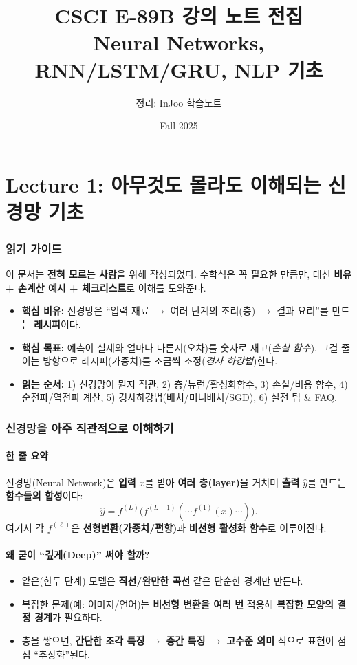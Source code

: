 \documentclass[12pt]{article}
\title{CSCI E-89B 강의 노트 전집 \\ \large Neural Networks, RNN/LSTM/GRU, NLP 기초}
\author{정리: InJoo 학습노트}
\date{Fall 2025}
\begin{document}
\maketitle

\tableofcontents
\newpage

\part{Lecture 1: 아무것도 몰라도 이해되는 신경망 기초}

\section*{읽기 가이드}
이 문서는 \textbf{전혀 모르는 사람}을 위해 작성되었다.
수학식은 꼭 필요한 만큼만, 대신 \textbf{비유 + 손계산 예시 + 체크리스트}로 이해를 도와준다.

\begin{itemize}[left=0pt]
  \item \textbf{핵심 비유:} 신경망은 ``입력 재료 $\rightarrow$ 여러 단계의 조리(층) $\rightarrow$ 결과 요리''를 만드는 \textbf{레시피}이다.
  \item \textbf{핵심 목표:} 예측이 실제와 얼마나 다른지(오차)를 숫자로 재고(\textit{손실 함수}), 그걸 줄이는 방향으로 레시피(가중치)를 조금씩 조정(\textit{경사 하강법})한다.
  \item \textbf{읽는 순서:} 1) 신경망이 뭔지 직관, 2) 층/뉴런/활성화함수, 3) 손실/비용 함수, 4) 순전파/역전파 계산, 5) 경사하강법(배치/미니배치/SGD), 6) 실전 팁 \& FAQ.
\end{itemize}

\section{신경망을 아주 직관적으로 이해하기}
\subsection*{한 줄 요약}
신경망(Neural Network)은 \textbf{입력} $x$를 받아 \textbf{여러 층(layer)}을 거치며 \textbf{출력} $\hat{y}$를 만드는 \textbf{함수들의 합성}이다:
\[
\hat{y} = f^{(L)}\big(f^{(L-1)}(\cdots f^{(1)}(x)\cdots)\big).
\]
여기서 각 $f^{(\ell)}$은 \textbf{선형변환(가중치/편향)}과 \textbf{비선형 활성화 함수}로 이루어진다.

\subsection*{왜 굳이 ``깊게(Deep)'' 써야 할까?}
\begin{itemize}
  \item 얕은(한두 단계) 모델은 \textbf{직선/완만한 곡선} 같은 단순한 경계만 만든다.
  \item 복잡한 문제(예: 이미지/언어)는 \textbf{비선형 변환을 여러 번} 적용해 \textbf{복잡한 모양의 결정 경계}가 필요하다.
  \item 층을 쌓으면, \textbf{간단한 조각 특징} $\rightarrow$ \textbf{중간 특징} $\rightarrow$ \textbf{고수준 의미} 식으로 표현이 점점 ``추상화''된다.
\end{itemize}
\end{document}
